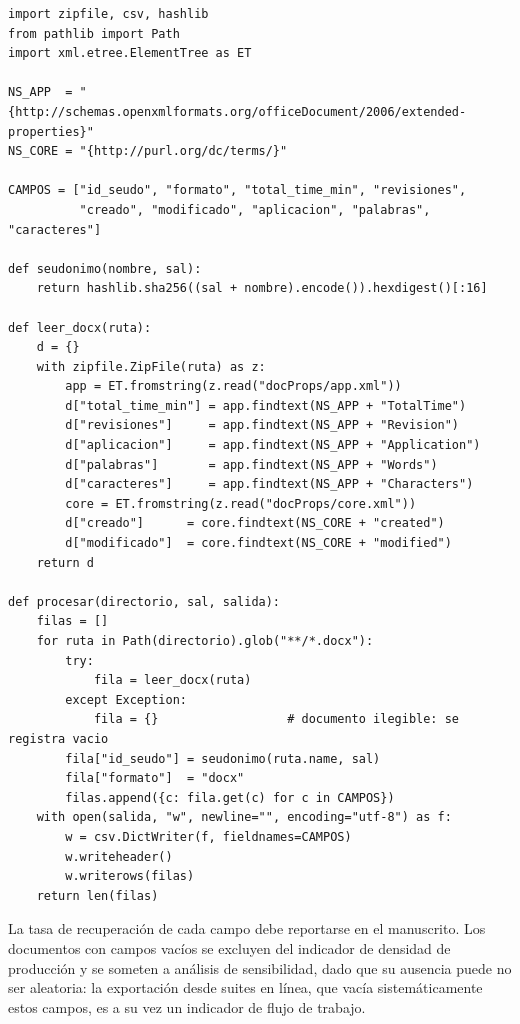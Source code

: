 \documentclass[11pt,a4paper]{article}
\begin{document}
\begin{lstlisting}
import zipfile, csv, hashlib
from pathlib import Path
import xml.etree.ElementTree as ET

NS_APP  = "{http://schemas.openxmlformats.org/officeDocument/2006/extended-properties}"
NS_CORE = "{http://purl.org/dc/terms/}"

CAMPOS = ["id_seudo", "formato", "total_time_min", "revisiones",
          "creado", "modificado", "aplicacion", "palabras", "caracteres"]

def seudonimo(nombre, sal):
    return hashlib.sha256((sal + nombre).encode()).hexdigest()[:16]

def leer_docx(ruta):
    d = {}
    with zipfile.ZipFile(ruta) as z:
        app = ET.fromstring(z.read("docProps/app.xml"))
        d["total_time_min"] = app.findtext(NS_APP + "TotalTime")
        d["revisiones"]     = app.findtext(NS_APP + "Revision")
        d["aplicacion"]     = app.findtext(NS_APP + "Application")
        d["palabras"]       = app.findtext(NS_APP + "Words")
        d["caracteres"]     = app.findtext(NS_APP + "Characters")
        core = ET.fromstring(z.read("docProps/core.xml"))
        d["creado"]      = core.findtext(NS_CORE + "created")
        d["modificado"]  = core.findtext(NS_CORE + "modified")
    return d

def procesar(directorio, sal, salida):
    filas = []
    for ruta in Path(directorio).glob("**/*.docx"):
        try:
            fila = leer_docx(ruta)
        except Exception:
            fila = {}                  # documento ilegible: se registra vacio
        fila["id_seudo"] = seudonimo(ruta.name, sal)
        fila["formato"]  = "docx"
        filas.append({c: fila.get(c) for c in CAMPOS})
    with open(salida, "w", newline="", encoding="utf-8") as f:
        w = csv.DictWriter(f, fieldnames=CAMPOS)
        w.writeheader()
        w.writerows(filas)
    return len(filas)
\end{lstlisting}

La tasa de recuperación de cada campo debe reportarse en el manuscrito. Los documentos con campos vacíos se excluyen del indicador de densidad de producción y se someten a análisis de sensibilidad, dado que su ausencia puede no ser aleatoria: la exportación desde suites en línea, que vacía sistemáticamente estos campos, es a su vez un indicador de flujo de trabajo.

\newpage

\end{document}
